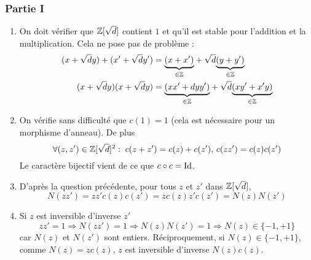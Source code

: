 \subsubsection*{Partie I}
\begin{enumerate}
 \item On doit vérifier que $\mathbb{Z}[\sqrt d ]$ contient $1$ et qu'il est stable pour l'addition et la multiplication. Cela ne pose pas de problème :
\begin{align*}
 (x+\sqrt{d}y)+ (x'+\sqrt{d}y') &= \underset{\in \mathbb{Z}}{\underbrace{(x+x')}}+\sqrt{d}\underset{\in \mathbb{Z}}{\underbrace{(y+y')}}\\
(x+\sqrt{d}y)(x+\sqrt{d}y) &= \underset{\in \mathbb{Z}}{\underbrace{(xx'+dyy')}}+\sqrt{d}\underset{\in \mathbb{Z}}{\underbrace{(xy'+x'y)}}
\end{align*}
\item On vérifie sans difficulté que $c(1)=1$ (cela est nécessaire pour un morphisme d'anneau). De plus
\begin{displaymath}
 \forall (z,z')\in \mathbb{Z}[\sqrt d]^2 : \;c(z+z')=c(z)+c(z'),\, c(zz')=c(z)c(z')
\end{displaymath}
Le caractère bijectif vient de ce que $c\circ c =\operatorname{Id}$.
\item D'après la question précédente, pour tous $z$ et $z'$ dans $\mathbb{Z}[\sqrt d]$,
\begin{displaymath}
 N(zz') = zz'c(z)c(z')=zc(z)z'c(z')=N(z)N(z')
\end{displaymath}
\item Si $z$ est inversible d'inverse $z'$
\begin{displaymath}
 zz'=1\Rightarrow N(zz')=1\Rightarrow N(z)N(z')=1 \Rightarrow N(z)\in \{-1,+1\}
\end{displaymath}
car $N(z)$ et $N(z')$ sont entiers.
Réciproquement, si $N(z)\in \{-1,+1\}$, comme $N(z)=zc(z)$, $z$ est inversible d'inverse $N(z)c(z)$.
\end{enumerate}
